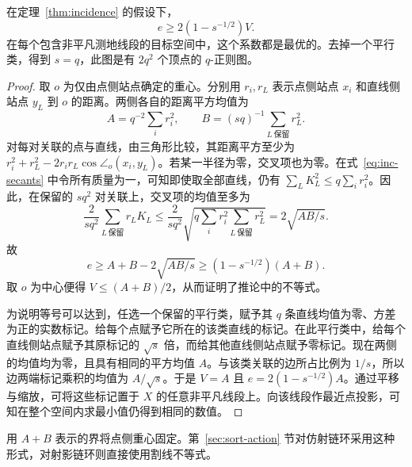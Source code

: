 \begin{corollary}[仿射关联链环]\label{cor:inc-link}
在定理~\ref{thm:incidence} 的假设下，
\[
                   e\ge 2(1-s^{-1/2}) V .
\]
在每个包含非平凡测地线段的目标空间中，这个系数都是最优的。去掉一个平行类，得到 $s=q$，此图是有 $2q^2$ 个顶点的 $q$-正则图。
\end{corollary}

\begin{proof}
取 $o$ 为仅由点侧站点确定的重心。分别用 $r_i,r_L$ 表示点侧站点 $x_i$ 和直线侧站点 $y_L$ 到 $o$ 的距离。两侧各自的距离平方均值为
\[
             A=q^{-2}\sum_i r_i^2,\qquad
             B=(sq)^{-1}\sum_{L\ \text{保留}} r_L^2 .
\]
对每对关联的点与直线，由三角形比较，其距离平方至少为 $r_i^2+r_L^2-2r_i r_L\cos\angle_o(x_i,y_L)$。若某一半径为零，交叉项也为零。在式~\eqref{eq:inc-secants} 中令所有质量为一，可知即使取全部直线，仍有 $\sum_L K_L^2\le q\sum_i r_i^2$。因此，在保留的 $s q^2$ 对关联上，交叉项的均值至多为
\[
 \frac{2}{s q^2}\sum_{L\ \text{保留}}r_L K_L
        \le\frac{2}{s q^2}
           \sqrt{q\sum_i r_i^2\sum_{L\ \text{保留}}r_L^2}
        = 2\sqrt{AB/s}.
\]
故
\[
      e\ge A+B-2\sqrt{AB/s}\ge (1-s^{-1/2})(A+B).
\]
取 $o$ 为中心便得 $V\le(A+B)/2$，从而证明了推论中的不等式。

为说明等号可以达到，任选一个保留的平行类，赋予其 $q$ 条直线均值为零、方差为正的实数标记。给每个点赋予它所在的该类直线的标记。在此平行类中，给每个直线侧站点赋予其原标记的 $\sqrt s$ 倍，而给其他直线侧站点赋予零标记。现在两侧的均值均为零，且具有相同的平方均值 $A$。与该类关联的边所占比例为 $1/s$，所以边两端标记乘积的均值为 $A/\sqrt s$。于是 $V=A$ 且 $e=2(1-s^{-1/2})A$。通过平移与缩放，可将这些标记置于 $X$ 的任意非平凡线段上。向该线段作最近点投影，可知在整个空间内求最小值仍得到相同的数值。
\end{proof}

用 $A+B$ 表示的界将点侧重心固定。第~\ref{sec:sort-action} 节对仿射链环采用这种形式，对射影链环则直接使用割线不等式。
